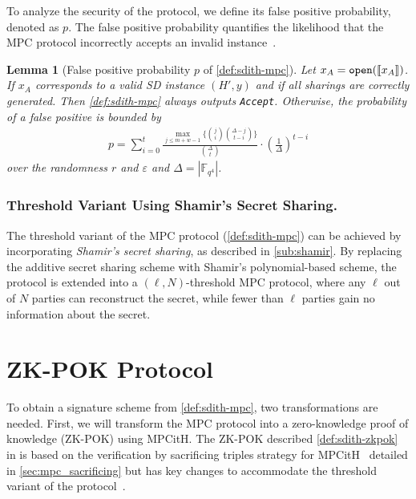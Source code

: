 \documentclass[11pt]{report}
\theoremstyle{definition}
\theoremstyle{plain}
\newtheorem{lemma}{Lemma}[section]
\begin{document}
To analyze the security of the protocol, we define its false positive probability, denoted as $p$. The false positive probability quantifies the likelihood that the MPC protocol incorrectly accepts an invalid instance~\cite{feneuil2022syndrome,aguilarsyndrome11}.

\begin{lemma}[False positive probability $p$ of \autoref{def:sdith-mpc}]\label{lem:sdith-mpc-soundness}
  Let $x_A = \texttt{open}(\llbracket x_A \rrbracket)$. If $x_A$ corresponds to a valid SD instance $(H', y)$ and if all sharings are correctly generated. Then \autoref{def:sdith-mpc} always outputs \texttt{Accept}.
  Otherwise, the probability of a false positive is bounded by
  \begin{align*}
    p = \sum_{i=0}^t \frac{\max_{j \leq m + w -1} \{ \binom{j}{i} \binom{\Delta - j}{t-i} \}}{\binom{\Delta}{t}} \cdot \left(\frac{1}{\Delta}\right)^{t-i}
  \end{align*} over the randomness $r$ and $\varepsilon$ and $\Delta = |\mathbb{F}_{q^4}|$.
\end{lemma}

\subsubsection{Threshold Variant Using Shamir's Secret Sharing.}
The threshold variant of the MPC protocol (\autoref{def:sdith-mpc}) can be achieved by incorporating \textit{Shamir's secret sharing}, as described in \autoref{sub:shamir}. By replacing the additive secret sharing scheme with Shamir's polynomial-based scheme, the protocol is extended into a \((\ell, N)\)-threshold MPC protocol, where any \(\ell\) out of \(N\) parties can reconstruct the secret, while fewer than \(\ell\) parties gain no information about the secret.

\section{ZK-POK Protocol}\label{sec:sdith-zkpok}

To obtain a signature scheme from \autoref{def:sdith-mpc}, two transformations are needed. First, we will transform the MPC protocol into a zero-knowledge proof of knowledge (ZK-POK) using MPCitH. The ZK-POK described \autoref{def:sdith-zkpok} in is based on the verification by sacrificing triples strategy for MPCitH~\cite{baum2020concretely} detailed in \autoref{sec:mpc_sacrificing} but has key changes to accommodate the threshold variant of the protocol~\cite{feneuil2023threshold,feneuil2023threshold2}.
\end{document}
